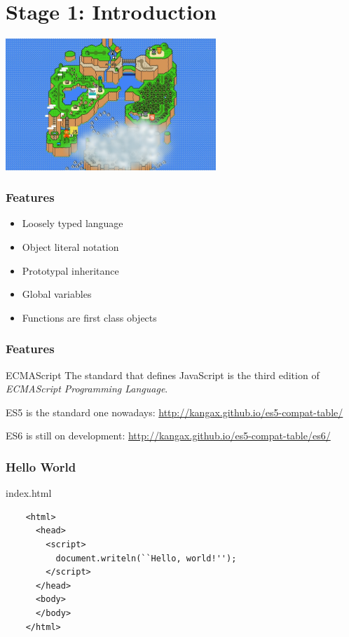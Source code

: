 \section{Stage 1: Introduction}

\begin{frame}
  \begin{center}
    \includegraphics[width=300px]{images/map_stage_1.png}
  \end{center}
\end{frame}

\begin{frame}
  \frametitle{Features}

  \begin{itemize}
    \item Loosely typed language
    \pause\item Object literal notation
    \pause\item Prototypal inheritance
    \pause\item Global variables
    \pause\item Functions are first class objects
  \end{itemize}
\end{frame}

\begin{frame}
  \frametitle{Features}

  \begin{block}{ECMAScript}
    The standard that defines JavaScript is the third edition of \textit{ECMAScript Programming Language}.
  \end{block}

  \pause

  ES5 is the standard one nowadays: \url{http://kangax.github.io/es5-compat-table/}
  
  \pause

  ES6 is still on development: \url{http://kangax.github.io/es5-compat-table/es6/}
\end{frame}

\begin{frame}[fragile]
  \frametitle{Hello World}

  \begin{block}{index.html}
    {\scriptsize
    \begin{verbatim}
    <html>
      <head>
        <script>
          document.writeln(``Hello, world!'');
        </script>
      </head>
      <body>
      </body>
    </html>
    \end{verbatim}
    }
  \end{block}
\end{frame}

